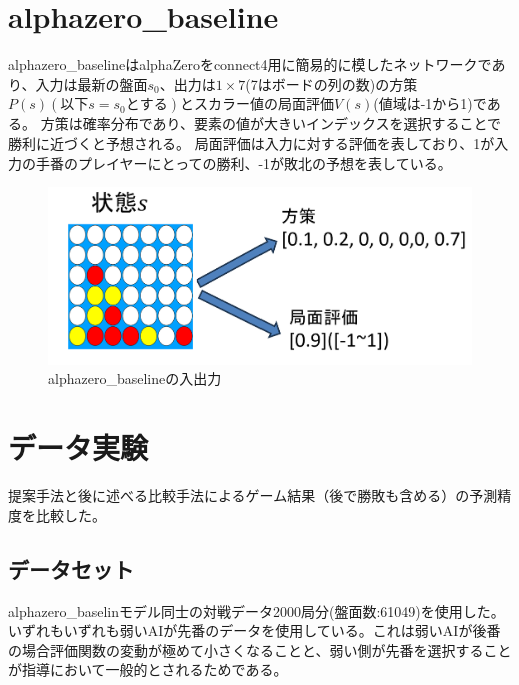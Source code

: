 \section{alphazero\_baseline}
alphazero\_baseline\cite{baseline}はalphaZeroをconnect4用に簡易的に模したネットワークであり、入力は最新の盤面$s_0$、出力は$1\times7$(7はボードの列の数)の方策$P(s)(以下s=s_0とする)$とスカラー値の局面評価$V(s)$(値域は-1から1)である。
方策は確率分布であり、要素の値が大きいインデックスを選択することで勝利に近づくと予想される。
局面評価は入力に対する評価を表しており、1が入力の手番のプレイヤーにとっての勝利、-1が敗北の予想を表している。
\begin{figure}[t]
    \centering
    \includegraphics[trim={0cm 0cm 0cm 0cm},clip]{./figure/baseline.png}

    \caption{alphazero\_baselineの入出力}
    \label{fig:baseline}
\end{figure}


\section{データ実験}
\label{chap:evaluation}
提案手法と後に述べる比較手法によるゲーム結果（後で勝敗も含める）の予測精度を比較した。
\subsection{データセット}
alphazero\_baselinモデル同士の対戦データ2000局分(盤面数:61049)を使用した。いずれもいずれも弱いAIが先番のデータを使用している。これは弱いAIが後番の場合評価関数の変動が極めて小さくなることと、弱い側が先番を選択することが指導において一般的とされるためである。

